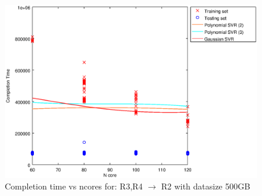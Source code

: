 
\begin {figure}[hbtp]
\centering
\includegraphics[width=\textwidth]{output/R3_R4_VS_R2_500_ALL_FEATURES/plot_R3_R4_VS_R2_500_bestmodels.eps}
\caption{Completion time vs ncores for: R3,R4 $\rightarrow$ R2 with datasize 500GB}
\label{fig:coreonly_linear_R3,R4_R2_500}
\end {figure}
